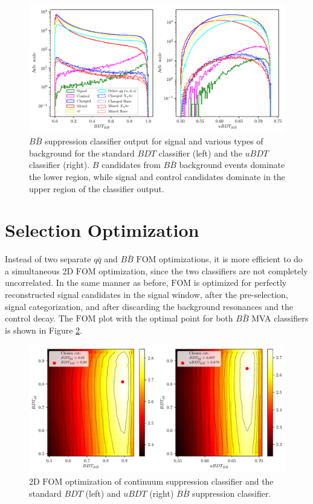 \begin{figure}[H]
	\centering
	\captionsetup{width=0.8\linewidth}
	\includegraphics[width=\linewidth]{fig/bb_BDT}
	\caption{$B\bar B$ suppression classifier output for signal and various types of background for the standard $BDT$ classifier (left) and the $uBDT$ classifier (right). $B$ candidates from $B\bar B$ background events dominate the lower region, while signal and control candidates dominate in the upper region of the classifier output.}
	\label{fig:bbmva}
\end{figure}

\section{Selection Optimization}\label{sec:selection-optimization}

Instead of two separate $q \bar q$ and $B \bar B$ $\mathrm{FOM}$ optimizations, it is more efficient to do a simultaneous 2D $\mathrm{FOM}$ optimization, since the two classifiers are not completely uncorrelated. In the same manner as before, $\mathrm{FOM}$ is optimized for perfectly reconstructed signal candidates in the signal window, after the pre-selection, signal categorization, and after discarding the background resonances and the control decay. The $\mathrm{FOM}$ plot with the optimal point for both $B \bar B$ MVA classifiers is shown in Figure \ref{fig:mvafom}.

\begin{figure}[H]
	\centering
	\captionsetup{width=0.8\linewidth}
	\includegraphics[width=\linewidth]{fig/mva_fom}
	\caption{2D $\mathrm{FOM}$ optimization of continuum suppression classifier and the standard $BDT$ (left) and $uBDT$ (right) $B\bar B$ suppression classifier.}
	\label{fig:mvafom}
\end{figure}

